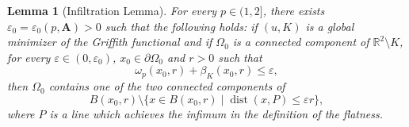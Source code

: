 \documentclass[12pt]{article}
\newtheorem{lemma}[theorem]{Lemma}
\theoremstyle{definition}
\theoremstyle{remark}
\numberwithin{equation}{section}
\DeclareMathOperator{\dist}{dist}
\newcommand{\dd}{\partial}
\newcommand{\R}{\mathbb{R}}
\newcommand{\A}{\mathbf{A}}
\begin{document}
\begin{lemma}[Infiltration Lemma] 
    \label{LemmaStrip}
    For every $p\in(1,2]$, there exists $\varepsilon_0=\varepsilon_0(p,\A)>0$ such that the following holds: if
    $(u,K)$ is a global minimizer of the Griffith functional and if $\Omega_0$ is a connected component of
    $\R^2\setminus K$, for every $\varepsilon\in(0,\varepsilon_0)$, $x_0\in\dd\Omega_0$ and $r>0$ such that
    \begin{equation}
        \omega_p(x_0,r)+\beta_K(x_0,r) \leq \varepsilon,
    \end{equation}
    then $\Omega_0$ contains one of the two connected components of 
    \[B(x_0,r)\setminus \{x\in B(x_0,r) \mid \dist(x,P) \leq \varepsilon r\},\]
    where $P$ is a line which achieves the infimum in the definition of the flatness.
\end{lemma}
\end{document}
